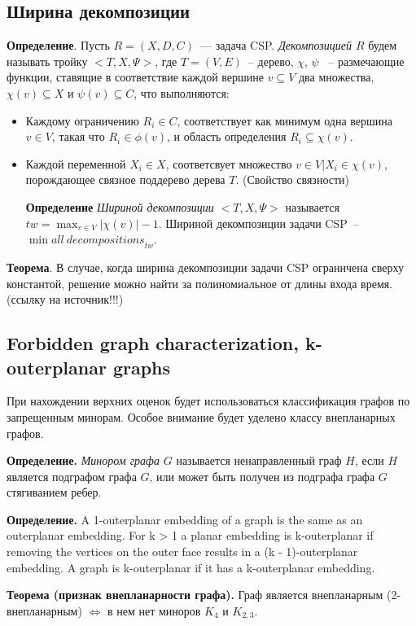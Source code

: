 \documentclass[12pt]{article}
\begin{document}
\subsection{Ширина декомпозиции}
\textbf{Определение}. Пусть $R = (X, D, C)$~--- задача CSP. \textit{Декомпозицией $R$} 
будем называть тройку $< T, X, \Psi >$, где $T = (V, E)$~-- дерево, $\chi$, $\psi$ ~-- 
размечающие функции, ставящие в соответствие каждой вершине $v \subseteq V$ два множества, $\chi(v) \subseteq X$
и $\psi(v) \subseteq C$, что выполняются:
\begin{itemize}
\item Каждому ограничению $R_i \in C$, соответствует как минимум одна вершина $v \in V$,
такая что $R_i \in \phi(v)$, и область определения $R_i \subseteq \chi(v)$.
\item Каждой переменной $X_i \in X$, соответсвует множество ${v \in V |X_i \in \chi(v)}$, порождающее
связное поддерево дерева $T$. (Свойство связности)

\textbf{Определение}
\textit{Шириной декомпозиции $ < T, X, \Psi >$} называется $tw = \max_{v \in V}{|\chi(v)| - 1}$.
Шириной декомпозиции задачи CSP~-- $\min{all~decompositions}_{tw}$.

\end{itemize}

\textbf{Теорема}. В случае, когда ширина декомпозиции задачи CSP ограничена сверху константой, 
решение можно найти за полиномиальное от длины входа время. (ссылку на источник!!!)

\subsection{Forbidden graph characterization, k-outerplanar graphs}
При нахождении верхних оценок будет использоваться классификация графов по запрещенным минорам.
Особое внимание будет уделено классу внепланарных графов.

\textbf{Определение.}
\textit{Минором графа} $G$ называется ненаправленный граф $H$, если $H$
является подграфом графа $G$, или может быть получен из подграфа графа $G$ 
стягиванием ребер.

\textbf{Определение.}
A 1-outerplanar embedding of a graph is the same as an outerplanar embedding. 
For k > 1 a planar embedding is k-outerplanar if removing the vertices on the outer
face results in a (k - 1)-outerplanar embedding. A graph is k-outerplanar if it has a 
k-outerplanar embedding.

\textbf{Теорема (признак внепланарности графа).}
Граф является внепланарным (2-внепланарным) $\iff$ в нем нет миноров $K_4$ и $K_{2,3}$\cite{Diestel00}.
\end{document}
